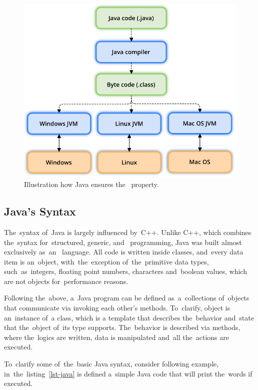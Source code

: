 \begin{figure}[!hbt]
	\centering
	\includegraphics[scale=0.7]{./figures/java-jvm.pdf}
	\caption{Illustration how Java ensures the~
	property.}
\end{figure}

\subsection{Java's Syntax}
The~syntax of~Java is largely influenced by~C++. Unlike C++, which combines
the~syntax for~structured, generic, and~ programming, Java
was built almost exclusively as~an~ language. All code is
written inside classes, and~every data item is an~object, with~the~exception
of~the~primitive data types, such~as~integers, floating point numbers,
characters and~boolean values, which are not objects for~performance reasons.

Following the~above, a~Java program can be defined as~a~collections of~objects
that communicate via invoking each other's methods. To~clarify, object is
an~instance of~a class, which is a template that describes the~behavior
and~state that the~object of~its type supports. The~behavior is described via
methods, where the~logics are written, data is manipulated and~all the~actions
are executed.

To~clarify some of~the~basic Java syntax, consider following example,
in~the~listing~\ref{lst-java} is defined a~simple Java code that will print
the~words  if executed.

